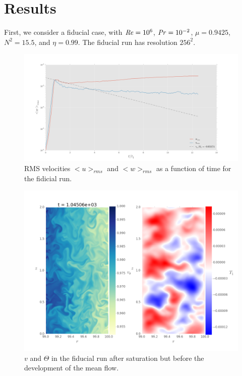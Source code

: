 \documentclass{jfm}
\begin{document}
\section{Results}
\label{sec:results}

First, we consider a fiducial case, with $\mbox{\textit{Re}} = 10^6$,
$\mbox{\textit{Pr}} = 10^{-2}$, $\mu = 0.9425$, $N^2 = 15.5$, and $\eta = 0.99$. The
fiducial run has resolution $256^2$. 

\begin{figure}
  \centering
  \includegraphics[width=\textwidth]{../../figs/rms_vel_re1.00e+06_mu9.43e-01_eta9.90e-01_Pr1.00e-02_N21.55e+01_nz256.png}
  \caption{RMS velocities $<u>_{rms}$ and $<w>_{rms}$ as a function of time for the fidicial run. }
  \label{fig:fid_energies}
\end{figure}

\begin{figure}
  \centering
  \includegraphics[width=\textwidth]{../../figs/vel_frame_0155_re1.00e+06_mu9.43e-01_eta9.90e-01_Pr1.00e-02_N21.55e+01_nz256.png}
  \caption{$v$ and $\Theta$ in the fiducial run after saturation but before the development of the mean flow.}
  \label{fig:fiducial_slice_early}
\end{figure}
\end{document}
